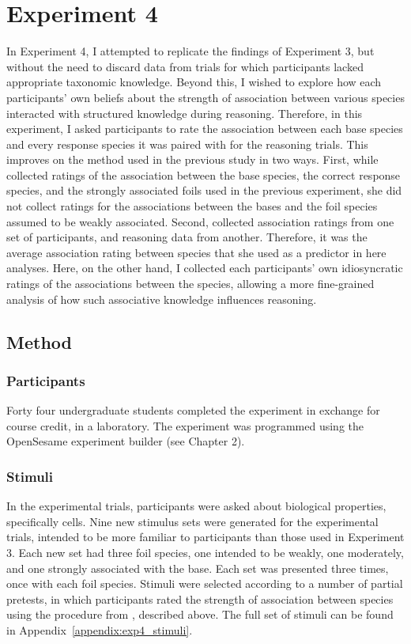 
\section{Experiment 4}

In Experiment 4, I attempted to replicate the findings of Experiment 3,
but without the need to discard data from
trials for which participants lacked appropriate taxonomic knowledge.
Beyond this, I wished to explore
how each participants' own beliefs about the strength of association
between various species interacted with structured knowledge during reasoning.
Therefore, in this experiment, I asked participants to rate
the association between each base species
and every response species it was paired with for the reasoning trials.
This improves on the method used in the previous study in two ways.
First, while \citet[Chapter 2]{Crisp-Bright2010} collected
ratings of the association between the base species,
the correct response species, and the strongly associated foils used in the previous experiment,
she did not collect ratings for the associations between the bases
and the foil species assumed to be weakly associated.
Second, \citet{Crisp-Bright2010} collected
association ratings from one set of participants,
and reasoning data from another.
Therefore, it was the average association rating between species
that she used as a predictor in here analyses.
Here, on the other hand, I collected each participants'
own idiosyncratic ratings of the associations between the species,
allowing a more fine-grained analysis of
how such associative knowledge influences reasoning.


\subsection{Method}

\subsubsection{Participants}

Forty four undergraduate students completed the experiment
in exchange for course credit, in a laboratory.
The experiment was programmed using the OpenSesame experiment builder
(see Chapter 2).

\subsubsection{Stimuli}

In the experimental trials, participants were asked about
biological properties, specifically cells.
Nine new stimulus sets were generated for the experimental trials,
intended to be more familiar to participants
than those used in Experiment 3.
Each new set had three foil species,
one intended to be weakly, one moderately,
and one strongly associated with the base.
Each set was presented three times, once with each foil species.
Stimuli were selected according to a number of partial pretests,
in which participants rated the strength of association between species
using the procedure from \citet[][Chapter 2]{Crisp-Bright2010}, described above.
The full set of stimuli can be found in Appendix~\ref{appendix:exp4_stimuli}.

